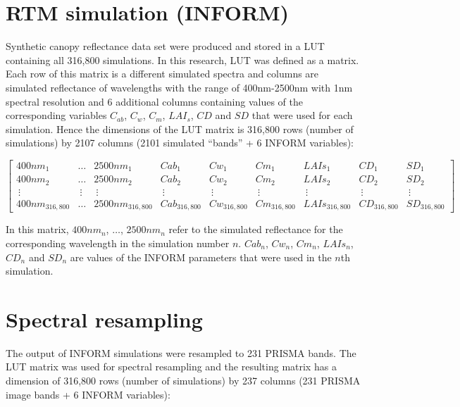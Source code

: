 \documentclass[a4paper, nobind]{templates/ociamthesis}
\begin{document}
\newpage

\hypertarget{rtm-simulation-inform-1}{%
\section{RTM simulation (INFORM)}\label{rtm-simulation-inform-1}}

Synthetic canopy reflectance data set were produced and stored in a LUT containing all 316,800 simulations. In this research, LUT was defined as a matrix. Each row of this matrix is a different simulated spectra and columns are simulated reflectance of wavelengths with the range of 400nm-2500nm with 1nm spectral resolution and 6 additional columns containing values of the corresponding variables \(C_{ab}\), \(C_{w}\), \(C_{m}\), \(LAI_{s}\), \(CD\) and \(SD\) that were used for each simulation. Hence the dimensions of the LUT matrix is 316,800 rows (number of simulations) by 2107 columns (2101 simulated ``bands'' + 6 INFORM variables):

\begingroup
\tiny

\[
\begin{bmatrix}
400nm_{1} & \dots & 2500nm_{1} & Cab_{1} & Cw_{1} & Cm_{1} & LAIs_{1} & CD_{1} & SD_{1}\\
400nm_{2} & \dots & 2500nm_{2} & Cab_{2} & Cw_{2} & Cm_{2} & LAIs_{2} & CD_{2} & SD_{2}\\
\ \vdots  &\ \vdots &\ \vdots &\ \vdots &\ \vdots &\ \vdots &\ \vdots &\ \vdots &\ \vdots\\
400nm_{316,800} & \dots & 2500nm_{316,800} & Cab_{316,800} & Cw_{316,800} & Cm_{316,800} & LAIs_{316,800} & CD_{316,800} & SD_{316,800}
\end{bmatrix}
\]
\endgroup

In this matrix, \(400nm_{n}\), \(\dots\), \(2500nm_{n}\) refer to the simulated reflectance for the corresponding wavelength in the simulation number \(n\). \(Cab_{n}\), \(Cw_{n}\), \(Cm_{n}\), \(LAIs_{n}\), \(CD_{n}\) and \(SD_{n}\) are values of the INFORM parameters that were used in the \(n\)th simulation.

\hypertarget{spectral-resampling-1}{%
\section{Spectral resampling}\label{spectral-resampling-1}}

The output of INFORM simulations were resampled to 231 PRISMA bands. The LUT matrix was used for spectral resampling and the resulting matrix has a dimension of 316,800 rows (number of simulations) by 237 columns (231 PRISMA image bands + 6 INFORM variables):
\end{document}
